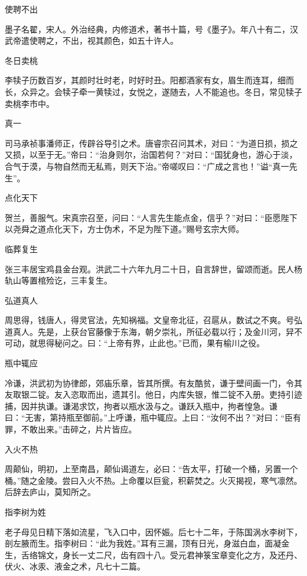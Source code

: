 \documentclass[a4paper,12pt,UTF8,twoside]{ctexbook}
\begin{document}
    使聘不出
    
    墨子名翟，宋人。外治经典，内修道术，著书十篇，号《墨子》。年八十有二，汉武帝遣使聘之，不出，视其颜色，如五十许人。
    
    冬日卖桃
    
    李犊子历数百岁，其颜时壮时老，时好时丑。阳都酒家有女，眉生而连耳，细而长，众异之。会犊子牵一黄犊过，女悦之，遂随去，人不能追也。冬日，常见犊子卖桃李市中。
    
    真一
    
    司马承祯事潘师正，传辟谷导引之术。唐睿宗召问其术，对曰：“为道日损，损之又损，以至于无。”帝曰：“治身则尔，治国若何？”对曰：“国犹身也，游心于淡，合气于漠，与物自然而无私焉，则天下治。”帝嗟叹曰：“广成之言也！”谥“真一先生”。
    
    点化天下
    
    贺兰，善服气。宋真宗召至，问曰：“人言先生能点金，信乎？”对曰：“臣愿陛下以尧舜之道点化天下，方士伪术，不足为陛下道。”赐号玄宗大师。
    
    临葬复生
    
    张三丰居宝鸡县金台观。洪武二十六年九月二十日，自言辞世，留颂而逝。民人杨轨山等置棺殓讫，三丰复生。
    
    弘道真人
    
    周思得，钱唐人，得灵官法，先知祸福。文皇帝北征，召扈从，数试之不爽。号弘道真人。先是，上获台官藤像于东海，朝夕崇礼，所征必载以行；及金川河，舁不可动，就思得秘问之。曰：“上帝有界，止此也。”已而，果有榆川之役。
    
    瓶中辄应
    
    冷谦，洪武初为协律郎，郊庙乐章，皆其所撰。有友酷贫，谦于壁间画一门，令其友取银二锭。友入恣取而出，遗其引。他日，内库失银，惟二锭不入册。吏持引迹捕，因并执谦。谦渴求饮，拘者以瓶水汲与之。谦跃入瓶中，拘者惶急。谦曰：“无害，第持瓶至御前。”上呼谦，瓶中辄应。上曰：“汝何不出？”对曰：“臣有罪，不敢出来。”击碎之，片片皆应。
    
    入火不热
    
    周颠仙，明初，上至南昌，颠仙谒道左，必曰：“告太平，打破一个桶，另置一个桶。”随之金陵。尝曰入火不热。上命覆以巨瓮，积薪焚之。火灭揭视，寒气凛然。后辞去庐山，莫知所之。
    
    指李树为姓
    
    老子母见日精下落如流星，飞入口中，因怀娠。后七十二年，于陈国涡水李树下，剖左腋而生。指李树曰：“此为我姓。”耳有三漏，顶有日光，身滋白血，面凝金生，舌络锦文，身长一丈二尺，齿有四十八。受元君神箓宝章变化之方，及还丹、伏火、冰汞、液金之术，凡七十二篇。
    
\end{document}
